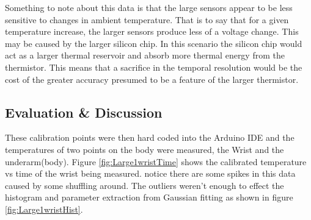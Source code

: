 \documentclass[12pt,a4paper]{report}
\begin{document}
Something to note about this data is that the large sensors appear to be less sensitive to changes in ambient temperature. That is to say that for a given temperature increase, the larger sensors produce less of a voltage change. This may be caused by the larger silicon chip. In this scenario the silicon chip would act as a larger thermal reservoir and absorb more thermal energy from the thermistor. This means that a sacrifice in the temporal resolution would be the cost of the greater accuracy presumed to be a feature of the larger thermistor.\par





\subsection{Evaluation \& Discussion}

These calibration points were then hard coded into the Arduino IDE and the temperatures of two points on the body were measured, the Wrist and the underarm(body). Figure \ref{fig:Large1wristTime} shows the calibrated temperature vs time of the wrist being measured. notice there are some spikes in this data caused by some shuffling around. The outliers weren't enough to effect the histogram and parameter extraction from Gaussian fitting as shown in figure \ref{fig:Large1wristHist}.
\end{document}

